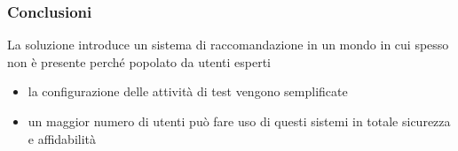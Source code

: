 \begin{frame}
    \frametitle{Conclusioni}
    La soluzione introduce un sistema di raccomandazione in un mondo in cui spesso non è presente perché 
    popolato da utenti esperti
    \begin{itemize}
        \item la configurazione delle attività di test vengono semplificate 
        \item un maggior numero di utenti può fare uso di questi sistemi in totale sicurezza e affidabilità 
    \end{itemize}
\end{frame}
